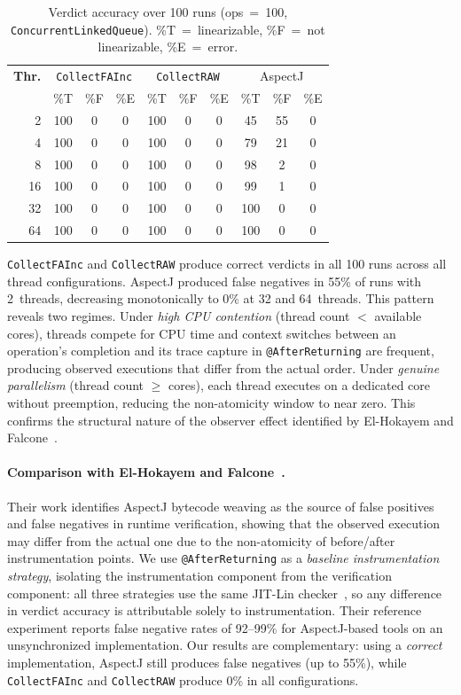 \documentclass[preprint,12pt]{elsarticle}
\begin{document}
\begin{table}[h!]
\centering
\scriptsize
\caption{Verdict accuracy over 100 runs (ops~=~100,
         \texttt{ConcurrentLinkedQueue}).
         \%T~=~linearizable, \%F~=~not linearizable, \%E~=~error.}
\label{tab:verdicts}
\begin{tabular}{rccccccccc}
\hline
\textbf{Thr.}
  & \multicolumn{3}{c}{\texttt{CollectFAInc}}
  & \multicolumn{3}{c}{\texttt{CollectRAW}}
  & \multicolumn{3}{c}{AspectJ} \\
  & \%T & \%F & \%E & \%T & \%F & \%E & \%T & \%F & \%E \\
\hline
 2 & 100 & 0 & 0 & 100 & 0 & 0 &  45 & 55 & 0 \\
 4 & 100 & 0 & 0 & 100 & 0 & 0 &  79 & 21 & 0 \\
 8 & 100 & 0 & 0 & 100 & 0 & 0 &  98 &  2 & 0 \\
16 & 100 & 0 & 0 & 100 & 0 & 0 &  99 &  1 & 0 \\
32 & 100 & 0 & 0 & 100 & 0 & 0 & 100 &  0 & 0 \\
64 & 100 & 0 & 0 & 100 & 0 & 0 & 100 &  0 & 0 \\
\hline
\end{tabular}
\end{table}

\texttt{CollectFAInc} and \texttt{CollectRAW} produce correct verdicts
in all 100 runs across all thread configurations. AspectJ produced false
negatives in 55\% of runs with 2~threads, decreasing monotonically to
0\% at 32 and 64~threads. This pattern reveals two regimes. Under
\emph{high CPU contention} (thread count $<$ available cores), threads
compete for CPU time and context switches between an operation's
completion and its trace capture in \texttt{@AfterReturning} are
frequent, producing observed executions that differ from the actual
order. Under \emph{genuine parallelism} (thread count $\geq$ cores),
each thread executes on a dedicated core without preemption, reducing the
non-atomicity window to near zero. This confirms the structural nature of
the observer effect identified by El-Hokayem and Falcone~\cite{E-HF18}.

\paragraph{Comparison with El-Hokayem and Falcone~\cite{E-HF18}.}
Their work identifies AspectJ bytecode weaving as the source of false
positives and false negatives in runtime verification, showing that the
observed execution may differ from the actual one due to the
non-atomicity of before/after instrumentation points. We use
\texttt{@AfterReturning} as a \emph{baseline instrumentation strategy},
isolating the instrumentation component from the verification component:
all three strategies use the same JIT-Lin checker~\cite{lowe2017}, so
any difference in verdict accuracy is attributable solely to
instrumentation. Their reference experiment reports false negative rates
of 92--99\% for AspectJ-based tools on an unsynchronized implementation.
Our results are complementary: using a \emph{correct} implementation,
AspectJ still produces false negatives (up to 55\%), while
\texttt{CollectFAInc} and \texttt{CollectRAW} produce 0\% in all
configurations.
\end{document}
